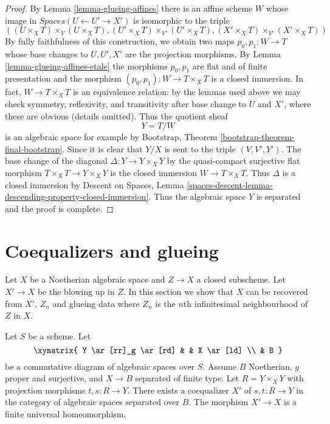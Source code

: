 \begin{proof}
\medskip\noindent
By Lemma \ref{lemma-glueing-affines} there is an affine scheme $W$ whose
image in $\textit{Spaces}(U \leftarrow U' \to X')$ is isomorphic to
the triple
$$
((U \times_X T) \times_V (U \times_X T),
(U' \times_X T) \times_{V'} (U' \times_X T),
(X' \times_X T) \times_{Y'} (X' \times_X T))
$$
By fully faithfulness of this construction, we obtain
two maps $p_0, p_1 : W \to T$ whose base changes
to $U, U', X'$ are the projection morphisms.
By Lemma \ref{lemma-glueing-affines-etale}
the morphisms $p_0, p_1$ are flat and of finite presentation and
the morphism $(p_0, p_1) : W \to T \times_X T$ is a closed immersion.
In fact, $W \to T \times_X T$ is an equivalence relation: by the lemmas
used above we may check symmetry, reflexivity, and transitivity
after base change to $U$ and $X'$, where these are obvious (details omitted).
Thus the quotient sheaf
$$
Y = T/W
$$
is an algebraic space for example by
Bootstrap, Theorem \ref{bootstrap-theorem-final-bootstrap}.
Since it is clear that $Y/X$ is sent to the triple $(V, V', Y')$.
The base change of the diagonal $\Delta : Y \to Y \times_X Y$
by the quasi-compact surjective flat morphism $T \times_X T \to Y \times_X Y$
is the closed immersion $W \to T \times_X T$. Thus $\Delta$
is a closed immersion by Descent on Spaces, Lemma
\ref{spaces-descent-lemma-descending-property-closed-immersion}.
Thus the algebraic space $Y$ is separated and the proof is complete.
\end{proof}








\section{Coequalizers and glueing}
\label{section-coequalizer-glue}

\noindent
Let $X$ be a Noetherian algebraic space and $Z \to X$ a closed subscheme.
Let $X' \to X$ be the blowing up in $Z$. In this section we show that
$X$ can be recovered from $X'$, $Z_n$ and glueing data where $Z_n$
is the $n$th infinitesimal neighbourhood of $Z$ in $X$.

\begin{lemma}
\label{lemma-coequalizer}
Let $S$ be a scheme. Let
$$
\xymatrix{
Y \ar[rr]_g \ar[rd] & & X \ar[ld] \\
& B
}
$$
be a commutative diagram of algebraic spaces over $S$. Assume
$B$ Noetherian, $g$ proper and surjective, and $X \to B$ separated
of finite type. Let $R = Y \times_X Y$ with projection morphisms
$t, s : R \to Y$.  There exists a coequalizer $X'$ of $s, t : R \to Y$
in the category of algebraic spaces separated over $B$. The morphism
$X' \to X$ is a finite universal homeomorphism.
\end{lemma}

